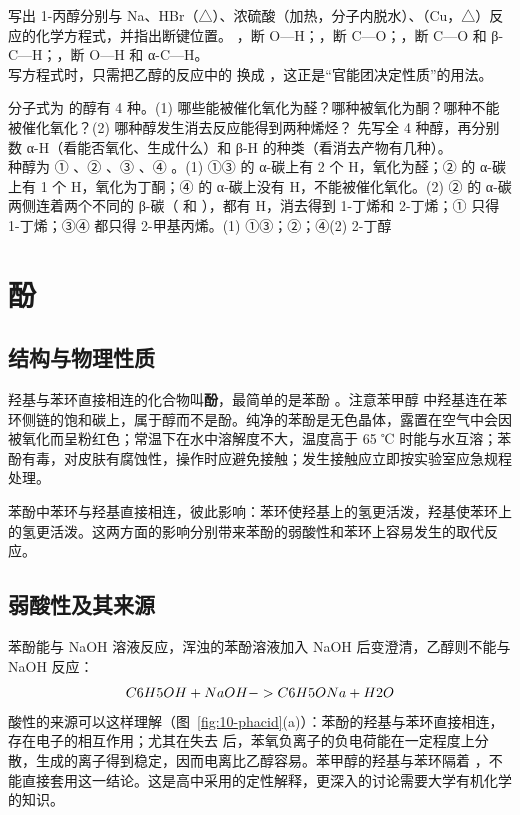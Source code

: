 \begin{liti}[基础]
写出 1-丙醇分别与 Na、HBr（△）、浓硫酸（加热，分子内脱水）、（Cu，△）反应的化学方程式，并指出断键位置。
\tcblower
\jie {}，断 O—H；，断 C—O；，断 C—O 和 β-C—H；，断 O—H 和 α-C—H。\\
\dianbo 写方程式时，只需把乙醇的反应中的  换成 ，这正是“官能团决定性质”的用法。
\end{liti}

\begin{liti}[典型]
分子式为  的醇有 4 种。(1) 哪些能被催化氧化为醛？哪种被氧化为酮？哪种不能被催化氧化？(2) 哪种醇发生消去反应能得到两种烯烃？
\tcblower
\silu 先写全 4 种醇，再分别数 α-H（看能否氧化、生成什么）和 β-H 的种类（看消去产物有几种）。\\
 种醇为 ① 、② 、③ 、④ 。(1) ①③ 的 α-碳上有 2 个 H，氧化为醛；② 的 α-碳上有 1 个 H，氧化为丁酮；④ 的 α-碳上没有 H，不能被催化氧化。(2) ② 的 α-碳两侧连着两个不同的 β-碳（ 和 ），都有 H，消去得到 1-丁烯和 2-丁烯；① 只得 1-丁烯；③④ 都只得 2-甲基丙烯。\daan (1) ①③；②；④\quad (2) 2-丁醇
\end{liti}

\section{酚}

\subsection{结构与物理性质}
羟基与苯环直接相连的化合物叫\textbf{酚}，最简单的是苯酚 。注意苯甲醇  中羟基连在苯环侧链的饱和碳上，属于醇而不是酚。纯净的苯酚是无色晶体，露置在空气中会因被氧化而呈粉红色；常温下在水中溶解度不大，温度高于 65 ℃ 时能与水互溶；苯酚有毒，对皮肤有腐蚀性，操作时应避免接触；发生接触应立即按实验室应急规程处理。

苯酚中苯环与羟基直接相连，彼此影响：苯环使羟基上的氢更活泼，羟基使苯环上的氢更活泼。这两方面的影响分别带来苯酚的弱酸性和苯环上容易发生的取代反应。

\subsection{弱酸性及其来源}
苯酚能与 NaOH 溶液反应，浑浊的苯酚溶液加入 NaOH 后变澄清，乙醇则不能与 NaOH 反应：
\[C6H5OH + NaOH -> C6H5ONa + H2O\]
酸性的来源可以这样理解（图~\ref{fig:10-phacid}(a)）：苯酚的羟基与苯环直接相连，存在电子的相互作用；尤其在失去  后，苯氧负离子的负电荷能在一定程度上分散，生成的离子得到稳定，因而电离比乙醇容易。苯甲醇的羟基与苯环隔着 ，不能直接套用这一结论。这是高中采用的定性解释，更深入的讨论需要大学有机化学的知识。

